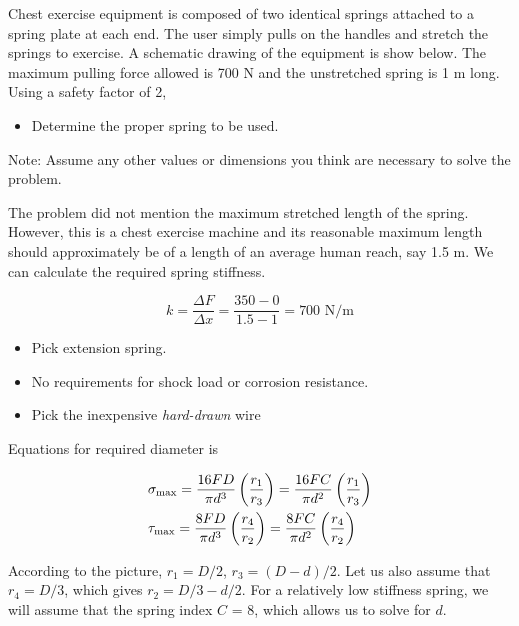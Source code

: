 \documentclass[a4paper,openany,nobib]{tufte-book}
\begin{document}
{{Chest exercise equipment is composed of two identical springs attached
to a spring plate at each end. The user simply pulls on the handles and
stretch the springs to exercise. A schematic drawing of the equipment is
show below. The maximum pulling force allowed is 700 N and the
unstretched spring is 1 m long. Using a safety factor of 2,

\begin{itemize}
\item Determine the proper spring to be used.
\end{itemize}

Note: Assume any other values or dimensions you think are necessary to
solve the problem.

The problem did not mention the maximum stretched length of the spring.
However, this is a chest exercise machine and its reasonable maximum
length should approximately be of a length of an average human reach,
say 1.5 m. We can calculate the required spring stiffness.

$$k = \frac{\Delta F}{\Delta x} = \frac{350 - 0}{1.5 - 1} = 700\text{ N/m}$$

\begin{itemize}
\item Pick extension spring.

\item No requirements for shock load or corrosion resistance.

\item Pick the inexpensive \emph{hard-drawn} wire
\end{itemize}

Equations for required diameter is

$$\begin{gathered}
  \sigma_{\max} = \frac{16FD}{\pi d^3}\left( \frac{r_1}{r_3} \right) = \frac{16FC}{\pi d^2}\left( \frac{r_1}{r_3} \right) \hfill \\
  \tau _{\max} = \frac{8FD}{\pi d^3}\left( \frac{r_4}{r_2} \right) = \frac{8FC}{\pi d^2}\left( \frac{r_4}{r_2} \right) \hfill \\ 
\end{gathered}$$


According to the picture, \(r_1 = D / 2\), \(r_3 = (D - d) / 2\). Let us
also assume that \(r_4 = D / 3\), which gives \(r_2 = D / 3 - d / 2\). For a
relatively low stiffness spring, we will assume that the spring index
\(C\) = 8, which allows us to solve for \(d\).

}}
\end{document}
